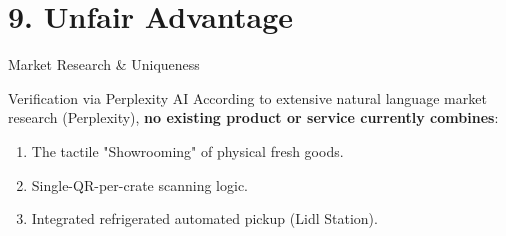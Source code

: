 \documentclass[aspectratio=169]{beamer}
\begin{document}
\section{9. Unfair Advantage}
\begin{frame}{Market Research \& Uniqueness}
    \begin{block}{Verification via Perplexity AI}
        According to extensive natural language market research (Perplexity), \textbf{no existing product or service currently combines}:
        \begin{enumerate}
            \item The tactile "Showrooming" of physical fresh goods.
            \item Single-QR-per-crate scanning logic.
            \item Integrated refrigerated automated pickup (Lidl Station).
        \end{enumerate}
    \end{block}

    \vspace{10pt}

    \centering
\end{frame}
\end{document}

